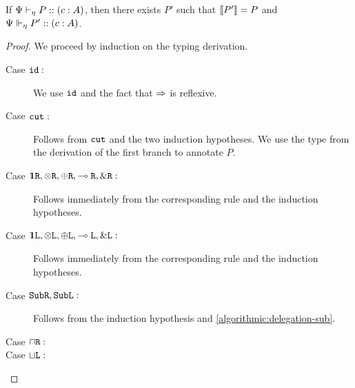 \begin{theorem}
  If ${\Psi} \vdash_{\eta} P :: (c : A)$, then there exists $P'$ such that $\llbracket P'\rrbracket = P$ and ${\Psi} \Vdash_{\eta} P' :: (c : A)$.
\end{theorem}
\begin{proof}
  We proceed by induction on the typing derivation.
  \begin{description}
    \item[Case $\texttt{id} :$] We use $\texttt{id}$ and the fact that $\mathrel\Rightarrow$ is reflexive.
    \item[Case $\texttt{cut} :$] Follows from $\texttt{cut}$ and the two induction hypotheses. We use the type from the derivation of the first branch to annotate $P$.

    \item[Case $\mathbf{1}\texttt{R}, \otimes\texttt{R}, \oplus\texttt{R}, \multimap\texttt{R}, \&\texttt{R} :$] Follows immediately from the corresponding rule and the induction hypotheses.
    \item[Case $\mathbf{1}\texttt{L}, \otimes\texttt{L}, \oplus\texttt{L}, \multimap\texttt{L}, \&\texttt{L} :$] Follows immediately from the corresponding rule and the induction hypotheses.

    \item[Case $\texttt{Sub}\texttt{R}, \texttt{Sub}\texttt{L} :$] Follows from the induction hypothesis and \cref{algorithmic:delegation-sub}.

    \item[Case $\mathbin{\sqcap}\texttt{R} :$] 
    \item[Case $\mathbin{\sqcup}\texttt{L} :$] 

  \end{description}

\end{proof}
